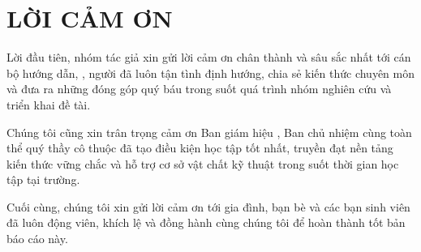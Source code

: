
\chapter*{LỜI CẢM ƠN}

Lời đầu tiên, nhóm tác giả xin gửi lời cảm ơn chân thành và sâu sắc nhất tới cán bộ hướng dẫn, \thesupervisor, người đã luôn tận tình định hướng, chia sẻ kiến thức chuyên môn và đưa ra những đóng góp quý báu trong suốt quá trình nhóm nghiên cứu và triển khai đề tài.

Chúng tôi cũng xin trân trọng cảm ơn Ban giám hiệu , Ban chủ nhiệm cùng toàn thể quý thầy cô thuộc \thefaculty đã tạo điều kiện học tập tốt nhất, truyền đạt nền tảng kiến thức vững chắc và hỗ trợ cơ sở vật chất kỹ thuật trong suốt thời gian học tập tại trường.

Cuối cùng, chúng tôi xin gửi lời cảm ơn tới gia đình, bạn bè và các bạn sinh viên đã luôn động viên, khích lệ và đồng hành cùng chúng tôi để hoàn thành tốt bản báo cáo này.
